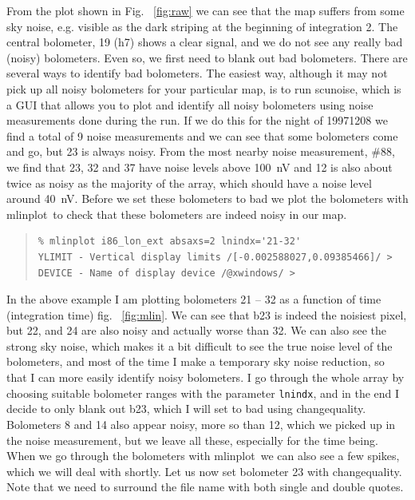 \documentclass[twoside,11pt]{article}
\newenvironment{myquote}{\begin{quote}\begin{small}}{\end{small}\end{quote}}
\newcommand{\task}[1]{\textsf{#1}}
\newcommand{\chgqual}{\xref{\task{change\_\-qua\-lity}}{sun216}{CHANGE_QUALITY}}
\newcommand{\scunoise}{\xref{\task{scunoise}}{sun216}{SCUNOISE}}
\newcommand{\mlinplot}{\xref{\task{mlinplot}}{sun95}{MLINPLOT}}
\newcommand{\xref}[3]{#1}
\renewcommand{\_}{\texttt{\symbol{95}}}
\begin{document}
From the plot shown in Fig. \ \ref{fig:raw} we can see that the map suffers
from some sky noise, e.g. visible as the dark striping at the beginning of
integration 2.  The central bolometer, 19 (h7) shows a clear signal, and we do
not see any really bad (noisy) bolometers. Even so, we first need to blank out
bad bolometers. There are several ways to identify bad bolometers. The easiest
way, although it may not pick up all noisy bolometers for your particular map,
is to run \scunoise, which is a GUI that allows you to plot and identify all
noisy bolometers using noise measurements done during the run.  If we do this
for the night of 19971208 we find a total of 9 noise measurements and we can
see that some bolometers come and go, but 23 is always noisy.  From the most
nearby noise measurement, \#88, we find that 23, 32 and 37 have noise levels
above 100~nV and 12 is also about twice as noisy as the majority of the array,
which should have a noise level around 40~nV. Before we set these bolometers
to bad we plot the bolometers with \mlinplot\ to check that these bolometers
are indeed noisy in our map.

\begin{myquote}
\begin{verbatim}
% mlinplot i86_lon_ext absaxs=2 lnindx='21-32'
YLIMIT - Vertical display limits /[-0.002588027,0.09385466]/ > 
DEVICE - Name of display device /@xwindows/ >
\end{verbatim}
\end{myquote}

In the above example  I am plotting bolometers 21 -- 32 as a function
of time (integration time) fig. \ \ref{fig:mlin}. We can see that b23 is
indeed the noisiest pixel, but 22, and 24 are also noisy and actually
worse than 32. We can also see the strong sky noise, which makes it a
bit difficult to see the true noise level of the bolometers, and most
of the time I make a temporary sky noise reduction, so that I can more
easily identify noisy bolometers. I go through the whole array by
choosing suitable bolometer ranges with the parameter \texttt{lnindx},
and in the end I decide to only blank out b23, which I will set to bad
using \chgqual.  Bolometers 8 and 14 also appear noisy, more so than
12, which we picked up in the noise measurement, but we leave all
these, especially for the time being.  When we go through the
bolometers with \mlinplot\ we can also see a few spikes, which we will
deal with shortly. Let us now set bolometer 23 with \chgqual. Note that
we need to surround the file name with both single and double quotes.
\end{document}
